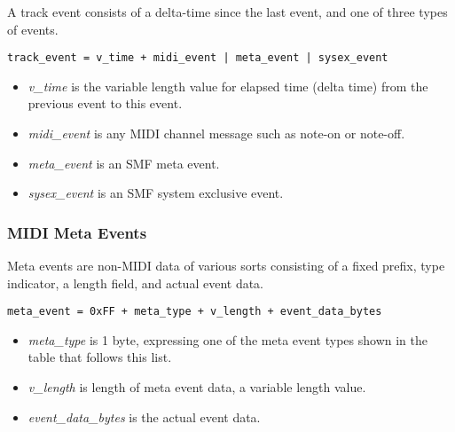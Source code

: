    A track event consists of a delta-time since the last event, and one of
   three types of events.
 
   \texttt{track\_event = v\_time + midi\_event | meta\_event | sysex\_event}
 
   \begin{itemize}
      \item \textsl{v\_time} is the variable length value for elapsed time
         (delta time) from the previous event to this event.
      \item \textsl{midi\_event} is any MIDI channel message such as note-on
         or note-off.
      \item \textsl{meta\_event} is an SMF meta event.
      \item \textsl{sysex\_event} is an SMF system exclusive event.
   \end{itemize}

\subsubsection{MIDI Meta Events}
\label{subsubsec:midi_meta_events}

   Meta events are non-MIDI data of various sorts consisting of a fixed prefix,
   type indicator, a length field, and actual event data.
 
   \texttt{meta\_event = 0xFF + meta\_type + v\_length + event\_data\_bytes}

   \begin{itemize}
      \item \textsl{meta\_type} is 1 byte, expressing one of the meta event
         types shown in the table that follows this list.
      \item \textsl{v\_length} is length of meta event data, a variable
         length value.
      \item \textsl{event\_data\_bytes} is the actual event data.
   \end{itemize}


